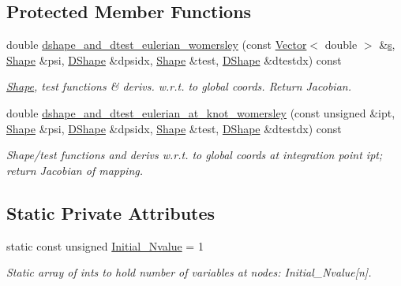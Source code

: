 \subsection*{Protected Member Functions}
\begin{DoxyCompactItemize}
\item 
double \hyperlink{classoomph_1_1TWomersleyElement_a745f06fe3f040dfe800fb09be9f38f1e}{dshape\+\_\+and\+\_\+dtest\+\_\+eulerian\+\_\+womersley} (const \hyperlink{classoomph_1_1Vector}{Vector}$<$ double $>$ \&\hyperlink{cfortran_8h_ab7123126e4885ef647dd9c6e3807a21c}{s}, \hyperlink{classoomph_1_1Shape}{Shape} \&psi, \hyperlink{classoomph_1_1DShape}{D\+Shape} \&dpsidx, \hyperlink{classoomph_1_1Shape}{Shape} \&test, \hyperlink{classoomph_1_1DShape}{D\+Shape} \&dtestdx) const
\begin{DoxyCompactList}\small\item\em \hyperlink{classoomph_1_1Shape}{Shape}, test functions \& derivs. w.\+r.\+t. to global coords. Return Jacobian. \end{DoxyCompactList}\item 
double \hyperlink{classoomph_1_1TWomersleyElement_a497b00b2f011802e86fa8a0ad45546e7}{dshape\+\_\+and\+\_\+dtest\+\_\+eulerian\+\_\+at\+\_\+knot\+\_\+womersley} (const unsigned \&ipt, \hyperlink{classoomph_1_1Shape}{Shape} \&psi, \hyperlink{classoomph_1_1DShape}{D\+Shape} \&dpsidx, \hyperlink{classoomph_1_1Shape}{Shape} \&test, \hyperlink{classoomph_1_1DShape}{D\+Shape} \&dtestdx) const
\begin{DoxyCompactList}\small\item\em Shape/test functions and derivs w.\+r.\+t. to global coords at integration point ipt; return Jacobian of mapping. \end{DoxyCompactList}\end{DoxyCompactItemize}
\subsection*{Static Private Attributes}
\begin{DoxyCompactItemize}
\item 
static const unsigned \hyperlink{classoomph_1_1TWomersleyElement_a58a6e5ed2d7fa22414e8878204886fbf}{Initial\+\_\+\+Nvalue} = 1
\begin{DoxyCompactList}\small\item\em Static array of ints to hold number of variables at nodes\+: Initial\+\_\+\+Nvalue\mbox{[}n\mbox{]}. \end{DoxyCompactList}\end{DoxyCompactItemize}

